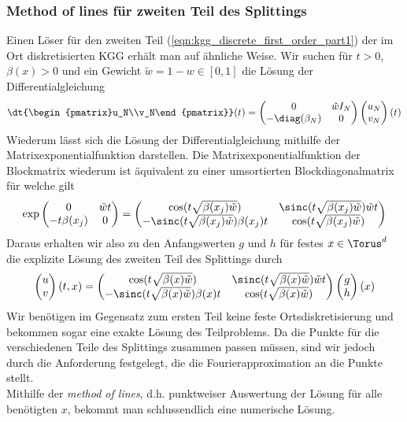 \subsubsection*{Method of lines für zweiten Teil des Splittings}
Einen Löser für den zweiten Teil (\ref{eqn:kgg_discrete_first_order_part1}) der im Ort diskretisierten KGG erhält man auf ähnliche Weise. Wir suchen für $t>0$, $\beta(x)>0$ und ein Gewicht $\tilde{w}=1-w\in [0,1]$ die Lösung der Differentialgleichung
\begin{equation*}
\dt{\begin{pmatrix}u_N\\v_N\end{pmatrix}}(t)=
\begin{pmatrix}0 & \tilde{w}I_N\\ -\diag({\beta_N}) & 0\end{pmatrix}
\begin{pmatrix}u_N\\v_N\end{pmatrix}(t)
\end{equation*}
Wiederum lässt sich die Lösung der Differentialgleichung mithilfe der Matrixexponentialfunktion darstellen. Die Matrixexponentialfunktion der Blockmatrix wiederum ist äquivalent zu einer umsortierten Blockdiagonalmatrix für welche gilt
\[\exp\begin{pmatrix}0 & \tilde{w}t\\ -t\beta(x_j) & 0\end{pmatrix}=
\begin{pmatrix}\cos(t\sqrt{\beta(x_j)\tilde{w}}) & \sinc(t\sqrt{\beta(x_j)\tilde{w}})\tilde{w}t\\
-\sinc(t\sqrt{\beta(x_j)\tilde{w}})\beta(x_j)t & \cos(t\sqrt{\beta(x_j)\tilde{w}})\end{pmatrix}\]
Daraus erhalten wir also zu den Anfangswerten $g$ und $h$ für festes $x\in \Torus^d$ die explizite Lösung des zweiten Teil des Splittings durch
\[\begin{pmatrix}u\\v\end{pmatrix}(t,x)=
\begin{pmatrix}\cos(t\sqrt{\beta(x)\tilde{w}}) & \sinc(t\sqrt{\beta(x)\tilde{w}})\tilde{w}t\\
-\sinc(t\sqrt{\beta(x)\tilde{w}})\beta(x)t & \cos(t\sqrt{\beta(x)\tilde{w}})\end{pmatrix}
\begin{pmatrix}g\\h\end{pmatrix}(x)\]
Wir benötigen im Gegensatz zum ersten Teil keine feste Ortsdiskretisierung und bekommen sogar eine exakte Lösung des Teilproblems. Da die Punkte für die verschiedenen Teile des Splittings zusammen passen müssen, sind wir jedoch durch die Anforderung festgelegt, die die Fourierapproximation an die Punkte stellt.\\
Mithilfe der \emph{method of lines}, d.h. punktweiser Auswertung der Lösung für alle benötigten $x$, bekommt man schlussendlich eine numerische Lösung.
